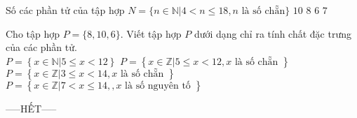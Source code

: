\documentclass[12pt,a4paper]{article}
\begin{document}
\begin{ex}
 Số các phần tử của tập hợp $N=\{n\in \mathbb{N}| 4< n \le 18, n \text{ là số chẵn} \}$ 
\choice
{ ${10}$ }
   { ${8}$ }
     { ${6}$ }
    { \True ${7}$ }
\end{ex}

\begin{ex}
 Cho tập hợp $P=\{{8, 10, 6}\}$. Viết tập hợp ${P}$ dưới dạng chỉ ra tính chất đặc trưng của các phần tử.\\ 
\choice
{ $P=\left\{x\in \mathbb{N}|5 \le x < 12 \right\}$ }
   { \True $P=\left\{x\in \mathbb{Z}|5 \le x < 12, x \text{ là số chẵn } \right\}$ }
     { $P=\left\{x\in \mathbb{Z}|3 \le x < 14, x \text{ là số chẵn } \right\}$ }
    { $P=\left\{x\in \mathbb{Z}|7 < x \le 14,, x \text{ là số nguyên tố } \right\}$ }
\end{ex}


 \begin{center}
-----HẾT-----
\end{center}

\end{document}
